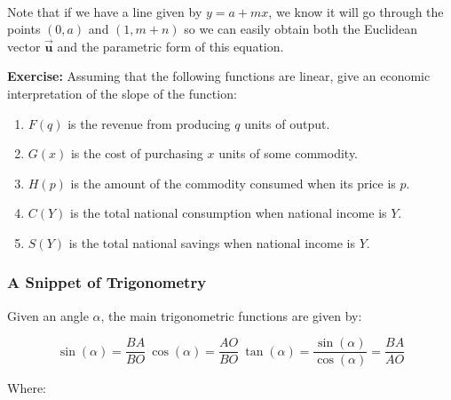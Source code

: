 \documentclass[11pt]{article}
\providecommand{\tightlist}{%
      \setlength{\itemsep}{0pt}\setlength{\parskip}{0pt}}
\begin{document}
    \begin{center}
    \end{center}
    { \hspace*{\fill} \\}
    
    Note that if we have a line given by \(y = a + m x\), we know it will go
through the points \((0,a)\) and \((1, m+n)\) so we can easily obtain
both the Euclidean vector \(\vec{\mathbf{u}}\) and the parametric form
of this equation.

\textbf{Exercise:} Assuming that the following functions are linear,
give an economic interpretation of the slope of the function:

\begin{enumerate}
\def\labelenumi{\arabic{enumi}.}
\tightlist
\item
  \(F(q)\) is the revenue from producing \(q\) units of output.
\item
  \(G(x)\) is the cost of purchasing \(x\) units of some commodity.
\item
  \(H(p)\) is the amount of the commodity consumed when its price is
  \(p\).
\item
  \(C(Y)\) is the total national consumption when national income is
  \(Y\).
\item
  \(S(Y)\) is the total national savings when national income is \(Y\).
\end{enumerate}

\hypertarget{a-snippet-of-trigonometry}{%
\subsubsection{A Snippet of
Trigonometry}\label{a-snippet-of-trigonometry}}

Given an angle \(\alpha\), the main trigonometric functions are given
by:

\[\sin(\alpha) = \frac{BA}{BO} \ \cos(\alpha) = \frac{AO}{BO} \ \tan(\alpha) = \frac{\sin(\alpha)}{\cos(\alpha)} = \frac{BA}{AO}\]

Where:
\end{document}
